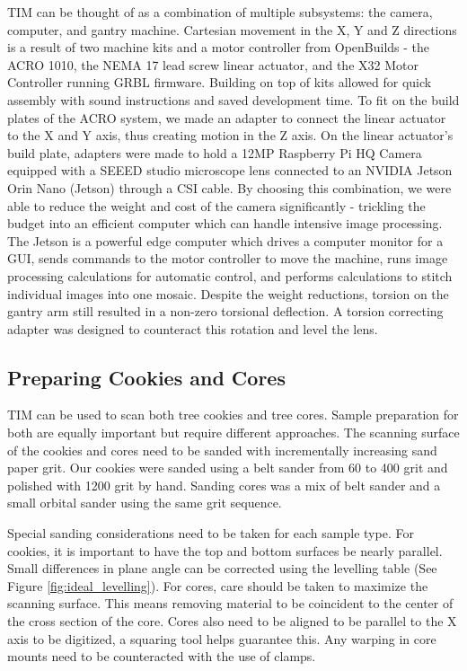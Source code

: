 \documentclass[a4paper,12pt]{article}
\begin{document}
TIM can be thought of as a combination of multiple subsystems: the camera, computer, and gantry machine. 
Cartesian movement in the X, Y and Z directions is a result of two machine kits and a motor controller from OpenBuilds - the ACRO 1010, the NEMA 17 lead screw linear actuator, and the X32 Motor Controller running GRBL firmware. 
Building on top of kits allowed for quick assembly with sound instructions and saved development time. 
To fit on the build plates of the ACRO system, we made an adapter to connect the linear actuator to the X and Y axis, thus creating motion in the Z axis.
On the linear actuator's build plate, adapters were made to hold a 12MP Raspberry Pi HQ Camera equipped with a SEEED studio microscope lens connected to an NVIDIA Jetson Orin Nano (Jetson) through a CSI cable.
By choosing this combination, we were able to reduce the weight and cost of the camera significantly - trickling the budget into an efficient computer which can handle intensive image processing. 
The Jetson is a powerful edge computer which drives a computer monitor for a GUI, sends commands to the motor controller to move the machine, runs image processing calculations for automatic control, and performs calculations to stitch individual images into one mosaic. 
Despite the weight reductions, torsion on the gantry arm still resulted in a non-zero torsional deflection. A torsion correcting adapter was designed to counteract this rotation and level the lens.


\subsection{Preparing Cookies and Cores}
TIM can be used to scan both tree cookies and tree cores. Sample preparation for both are equally important but require different approaches.
The scanning surface of the cookies and cores need to be sanded with incrementally increasing sand paper grit. Our cookies were sanded using a belt sander from 60 to 400 grit and polished with 1200 grit by hand.
Sanding cores was a mix of belt sander and a small orbital sander using the same grit sequence. 

Special sanding considerations need to be taken for each sample type. 
For cookies, it is important to have the top and bottom surfaces be nearly parallel. Small differences in plane angle can be corrected using the levelling table (See Figure \ref{fig:ideal_levelling}). 
For cores, care should be taken to maximize the scanning surface. This means removing material to be coincident to the center of the cross section of the core. 
Cores also need to be aligned to be parallel to the X axis to be digitized, a squaring tool helps guarantee this. Any warping in core mounts need to be counteracted with the use of clamps. 
\end{document}
